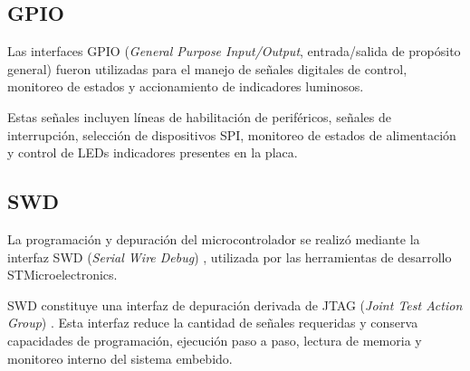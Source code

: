 \subsection{GPIO}

Las interfaces GPIO (\textit{General Purpose Input/Output}, entrada/salida de propósito general) fueron utilizadas para el manejo de señales digitales de control, monitoreo de estados y accionamiento de indicadores luminosos.

Estas señales incluyen líneas de habilitación de periféricos, señales de interrupción, selección de dispositivos SPI, monitoreo de estados de alimentación y control de LEDs indicadores presentes en la placa.

\subsection{SWD}

La programación y depuración del microcontrolador se realizó mediante la interfaz SWD (\textit{Serial Wire Debug}) \cite{swi}, utilizada por las herramientas de desarrollo STMicroelectronics.

SWD constituye una interfaz de depuración derivada de JTAG (\textit{Joint Test Action Group}) \cite{jtag}. Esta interfaz reduce la cantidad de señales requeridas y conserva capacidades de programación, ejecución paso a paso, lectura de memoria y monitoreo interno del sistema embebido.